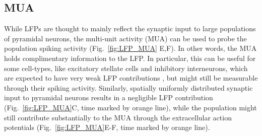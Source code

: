 \documentclass[preprint,11pt,authoryear]{elsarticle}
\newcommand{\hlj}[2][OliveGreen]{ {\sethlcolor{#1} \hl{#2}} }
\newcommand{\hlR}[2][red]{ {\sethlcolor{#1} \hl{#2}} }
\newcommand{\gen}[1]{\color{white}{\hlR{GTE: #1 }}\color{black}}
\newcommand{\tvnnote}[1]{\color{white}{\hlj{TVN: #1 }}\color{black}}
\newcommand{\tvntxt}[1]{{\color{OliveGreen}#1}}
\begin{document}




\subsection{MUA}
While LFPs are thought to mainly reflect the synaptic input to large populations of pyramidal neurons, the multi-unit activity (MUA) can be used to probe the population spiking activity \citep{Einevoll2007,Pettersen2008} (Fig.~\ref{fig:LFP_MUA} E,F). In other words, the MUA holds complimentary information to the LFP. In particular, this can be useful for some cell-types, like excitatory stellate cells and inhibitory interneurons, which are expected to have very weak LFP contributions \citep{Linden2011}, but might still be measurable through their spiking activity. 
Similarly, spatially uniformly distributed synaptic input to pyramidal neurons results in a negligible LFP contribution (Fig.~\ref{fig:LFP_MUA}C, time marked by orange line), while the population might still contribute substantially to the MUA through the extracellular action potentials (Fig.~\ref{fig:LFP_MUA}E-F, time marked by orange line). 
\end{document}

